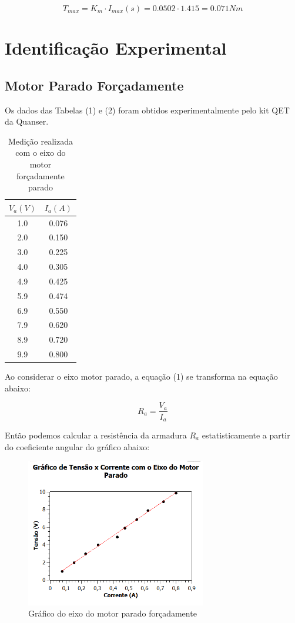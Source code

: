 \documentclass[12pt]{article}
\begin{document}
\begin{equation}
    T_{max} = K_m \cdot I_{max}(s) = 0.0502 \cdot 1.415 = 0.071 Nm
\end{equation}

\section{Identificação Experimental}

\subsection{Motor Parado Forçadamente}

\quad Os dados das Tabelas (1) e (2) foram obtidos experimentalmente pelo kit QET da Quanser. 

\begin{table}[H]
\centering
\begin{tabular}{c c} 
 \hline
 $V_a(V)$ & $I_a(A)$ \\ 
 \hline
 1.0 & 0.076 \\ 
 2.0 & 0.150 \\
 3.0 & 0.225 \\
 4.0 & 0.305\\
 4.9 & 0.425\\
 5.9 & 0.474\\
 6.9 & 0.550\\
 7.9 & 0.620\\
 8.9 & 0.720\\
 9.9 & 0.800\\
 \hline
\end{tabular}
\caption{Medição realizada com o eixo do motor forçadamente parado}
\label{table:data1}
\end{table}

\quad Ao considerar o eixo motor parado, a equação (1) se transforma na equação abaixo:

\begin{equation}
    R_a = \frac{V_a}{I_a}
\end{equation}

\quad Então podemos calcular a resistência da armadura $R_a$ estatisticamente  a partir do coeficiente angular do gráfico abaixo:

\begin{figure}[H] %
    \centering
    \includegraphics[width = 0.7\textwidth]{GRÁFICO 01.png}
    \caption{Gráfico do eixo do motor parado forçadamente}
    \label{fig:mesh3}
\end{figure}
\end{document}
